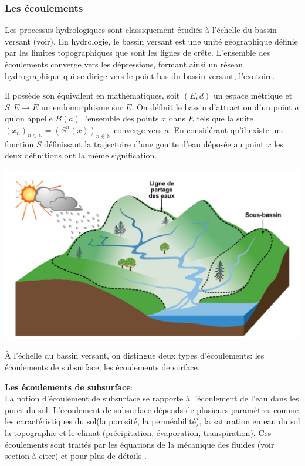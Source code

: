 \documentclass[a4paper,10pt]{article}
\begin{document}
\subsubsection{Les écoulements}

Les processus hydrologiques sont classiquement étudiés à l’échelle du bassin versant (voir). En hydrologie, le bassin versant est une unité géographique définie par les limites topographiques que sont les lignes de crête. L’ensemble des écoulements converge vers les dépressions, formant ainsi un réseau hydrographique qui se dirige vers le point bas du bassin versant, l’exutoire.

Il possède son équivalent en mathématiques, soit $(E,d)$ un espace métrique et $S:E\to E$ un endomorphisme sur $E$. On définit le bassin d'attraction d'un point $a$ qu'on appelle $B(a)$ l'ensemble des points $x$ dans $E$ tels que la suite $(x_n)_{n \in \mathbb{N}}=(S^n(x))_{n \in \mathbb{N}}$ converge vers $a$. En considérant qu'il existe une fonction $S$ définissant la trajectoire d'une goutte d'eau déposée au point $x$ les deux définitions ont la même signification.

\begin{center}
	\includegraphics[scale=0.15]{bassin_versant.png}
\end{center} 

À l’échelle du bassin versant, on distingue deux types d’écoulements: les écoulements de subsurface, les écoulements de surface. 

\textbf{Les écoulements de subsurface}:\\

La notion d'écoulement de subsurface se rapporte à l'écoulement de l'eau dans les pores du sol. L'écoulement de subsurface dépends de plusieurs paramètres comme les caractéristiques du sol(la porosité, la perméabilité), la saturation en eau du sol la topographie et le climat (précipitation, évaporation, transpiration). Ces écoulements sont traités par les équations de la mécanique des fluides (voir section  à citer) et pour plus de détails \cite{de1986quantitative}. 
\end{document}
